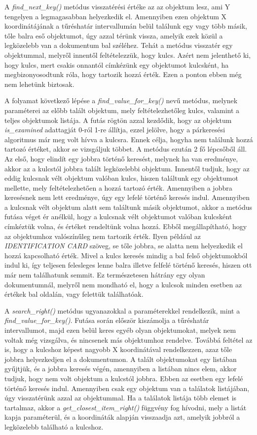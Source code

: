 \documentclass[12pt]{report}
\begin{document}
A \emph{find\_next\_key()} metódus visszatérési értéke az az objektum lesz, ami Y tengelyen a legmagasabban helyezkedik el. Amennyiben ezen objektum X koordinátájának a tűréshatár intervallumán belül találunk egy vagy több másik, tőle  balra eső objektumot, úgy azzal térünk vissza, amelyik ezek közül a legközelebb van a dokumentum bal széléhez. Tehát a metódus visszatér egy objektummal, melyről innentől feltételezzük, hogy kulcs. 
Azért nem jelenthető ki, hogy kulcs, mert csakis onnantól címkézünk egy objektumot kulcsként, ha megbizonyosodtunk róla, hogy tartozik hozzá érték. Ezen a ponton ebben még nem lehetünk biztosak.

A folyamat következő lépése a \emph{find\_value\_for\_key()} nevű metódus, melynek paraméterei az előbb talált objektum, mely feltételezhetőleg kulcs, valamint a teljes objektumok listája. A futás rögtön azzal kezdődik, hogy az objektum \emph{is\_examined} adattagját 0-ról 1-re állítja, ezzel jelölve, hogy a párkeresési algoritmus már meg volt hívva a kulcsra. Ennek célja, hogyha nem találunk hozzá tartozó értéket, akkor se vizsgáljuk többet. A metódus ezután 2 fő lépcsőből áll. Az első, hogy elindít egy jobbra történő keresést, melynek ha van eredménye, akkor az a kulcstól jobbra talált legközelebbi objektum.
Innentől tudjuk, hogy az eddig kulcsnak vélt objektum valóban kulcs, hiszen találtunk egy objektumot mellette, mely feltételezhetően a hozzá tartozó érték. Amennyiben a jobbra keresésnek nem lett eredménye, úgy egy lefelé történő keresés indul. Amennyiben a kulcsnak vélt objektum alatt sem találtunk másik objektumot, akkor a metódus futása véget ér anélkül, hogy a kulcsnak vélt objektumot valóban kulcsként címkéztük volna, és értéket rendeltünk volna hozzá. Ebből megállapítható, hogy az objektumhoz valószínűleg nem tartozik érték.
Ilyen például az \emph{IDENTIFICATION CARD} szöveg, se tőle jobbra, se alatta nem helyezkedik el hozzá kapcsolható érték.
Mivel a kulcs keresés mindig a bal felső objektumokból indul ki, így teljesen felesleges lenne balra illetve felfelé történő keresés, hiszen ott már nem találhatunk semmit. Ez természetesen hátrány egy olyan dokumentumnál, melyről nem mondható el, hogy a kulcsok minden esetben az értékek bal oldalán, vagy felettük találhatóak.

A \emph{search\_right()} metódus ugyanazokkal a paraméterekkel rendelkezik, mint a \break \emph{find\_value\_for\_key()}. Futása során először kiszámolja a tűréshatár intervallumot, majd ezen belül keres egyéb olyan objektumokat, melyek nem voltak még vizsgálva, és nincsenek más objektumhoz rendelve. Továbbá feltétel az is, hogy a kulcshoz képest nagyobb X koordinátával rendelkezzen, azaz tőle jobbra helyezkedjen el a dokumentumon.
A talált objektumokat egy listában gyűjtjük, és a jobbra keresés végén, amennyiben a listában nincs elem, akkor tudjuk, hogy nem volt objektum a kulcstól jobbra. Ebben az esetben egy lefelé történő keresés indul. Amennyiben csak egy objektum van a találatok listájában, úgy visszatérünk azzal az objektummal. Ha a találatok listája több elemet is tartalmaz, akkor a \emph{get\_closest\_item\_right()} függvény fog hívodni, mely a listát kapja paraméterül, és a koordináták alapján visszaadja azt, amelyik jobbról a legközelebb található a kulcshoz.
\end{document}
